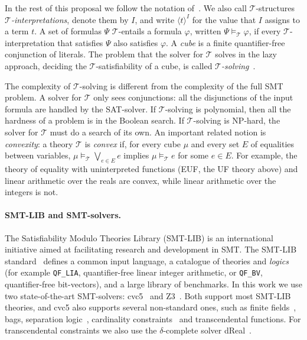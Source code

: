\documentclass[12pt,a4paper]{article}
\newcommand{\T}{\mathcal{T}}
\theoremstyle{definition}
\begin{document}
In the rest of this proposal we follow the notation of~\cite{Sebastiani16}. We also
call $\T$-structures \emph{$\T$-interpretations}, denote them by $I$, and write
$\langle t \rangle^I$ for the value that $I$ assigns to a term $t$. A set of
formulas $\Psi$ $\T$-entails a formula $\varphi$, written
$\Psi \models_\T \varphi$, if every $\T$-interpretation that satisfies $\Psi$ also
satisfies $\varphi$. A \emph{cube} is a finite quantifier-free conjunction of
literals. The problem that the solver for $\T$ solves in the lazy approach,
deciding the $\T$-satisfiability of a cube, is called
\emph{$\T$-solving}~\cite{Sebastiani16}.

The complexity of $\T$-solving is different from the complexity of the full SMT
problem. A solver for $\T$ only sees conjunctions: all the disjunctions of the
input formula are handled by the SAT-solver. If $\T$-solving is polynomial, then all
the hardness of a problem is in the Boolean search. If $\T$-solving is NP-hard, the
solver for $\T$ must do a search of its own. An important related notion is
\emph{convexity}: a theory $\T$ is \emph{convex} if, for every cube $\mu$ and every
set $E$ of equalities between variables, $\mu \models_\T \bigvee_{e \in E} e$
implies $\mu \models_\T e$ for some $e \in E$. For example, the theory of equality
with uninterpreted functions (EUF, the UF theory above) and linear arithmetic over
the reals are convex, while linear arithmetic over the integers is not.

\paragraph{SMT-LIB and SMT-solvers.}
The Satisfiability Modulo Theories Library (SMT-LIB) is an international
initiative aimed at facilitating research and development in SMT. The SMT-LIB
standard~\cite{SMTLIB26} defines a common input language, a catalogue of
theories and \emph{logics} (for example \texttt{QF\_LIA}, quantifier-free linear
integer arithmetic, or \texttt{QF\_BV}, quantifier-free bit-vectors), and a large
library of benchmarks. In this work we use two state-of-the-art SMT-solvers:
cvc5~\cite{cvc5} and Z3~\cite{z3}. Both support most SMT-LIB theories, and cvc5
also supports several non-standard ones, such as finite fields~\cite{OzdemirKTB23},
bags, separation logic~\cite{ReynoldsISK16}, cardinality
constraints~\cite{ReynoldsTGK13} and transcendental functions. For transcendental
constraints we also use the $\delta$-complete solver dReal~\cite{dreal}.

\end{document}
